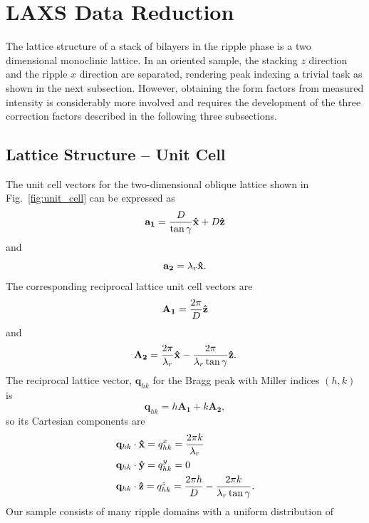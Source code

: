 \newpage
\section{LAXS Data Reduction}\label{sec:LAXS_data_reduction}
The lattice structure of a stack of bilayers in the ripple  phase is a two 
dimensional monoclinic lattice. 
In an oriented sample, the stacking $z$ direction and the ripple
$x$ direction are separated, rendering peak indexing a trivial task as 
shown in the next subsection.
However, obtaining the form factors from measured intensity is considerably
more involved and requires the development of the three correction factors 
described in the following three subsections.

\subsection{Lattice Structure -- Unit Cell}\label{sec:lattice_structure}
The unit cell vectors for the two-dimensional oblique lattice shown in Fig.~\ref{fig:unit_cell}
can be expressed as 
\begin{equation}
  \mathbf{a_1} = \frac{D}{\tan\gamma}\mathbf{\hat{x}} + D\mathbf{\hat{z}}
\end{equation}
and
\begin{equation}
  \mathbf{a_2} = \lambda_r\mathbf{\hat{x}}.
\end{equation}
The corresponding reciprocal lattice unit cell vectors are
\begin{equation}
  \mathbf{A_1} = \frac{2\pi}{D}\mathbf{\hat{z}}
\end{equation}
and
\begin{equation}
  \mathbf{A_2} = \frac{2\pi}{\lambda_r}\mathbf{\hat{x}} - \frac{2\pi}{\lambda_r\tan\gamma}\mathbf{\hat{z}}.
\end{equation}
The reciprocal lattice vector, $\mathbf{q}_{hk}$ for the Bragg peak with 
Miller indices $(h,k)$ is 
\begin{equation}
  \mathbf{q}_{hk}=h\mathbf{A_1}+k\mathbf{A_2},
\end{equation}
so its Cartesian components are
\begin{align}
  & \mathbf{q}_{hk}\cdot\mathbf{\hat{x}} = q_{hk}^x = \frac{2\pi k}{\lambda_r}\\
  & \mathbf{q}_{hk}\cdot\mathbf{\hat{y}} = q_{hk}^y = 0 \\
  & \mathbf{q}_{hk}\cdot\mathbf{\hat{z}} = q_{hk}^z = \frac{2\pi h}{D} - \frac{2\pi k}{\lambda_r\tan\gamma}.
\end{align}
Our sample consists of many ripple domains with a uniform distribution of 
